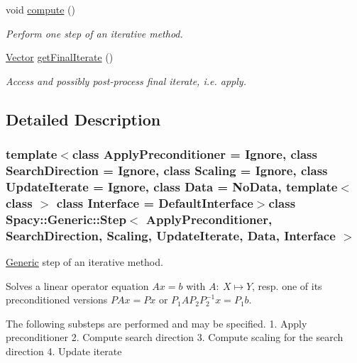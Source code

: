 \begin{DoxyCompactItemize}
\item 
void \hyperlink{classSpacy_1_1Generic_1_1Step_ac400c25a81a5138b4926bbb99692b343}{compute} ()
\begin{DoxyCompactList}\small\item\em \-Perform one step of an iterative method. \end{DoxyCompactList}\item 
\hyperlink{classSpacy_1_1Generic_1_1Vector}{\-Vector} \hyperlink{classSpacy_1_1Generic_1_1Step_a5be9a8afa47319b645b2df73b3b23acc}{get\-Final\-Iterate} ()
\begin{DoxyCompactList}\small\item\em \-Access and possibly post-\/process final iterate, i.\-e. apply. \end{DoxyCompactList}\end{DoxyCompactItemize}


\subsection{\-Detailed \-Description}
\subsubsection*{template$<$class Apply\-Preconditioner = \-Ignore, class Search\-Direction = \-Ignore, class Scaling = \-Ignore, class Update\-Iterate = \-Ignore, class Data = \-No\-Data, template$<$ class $>$ class \-Interface = \-Default\-Interface$>$class Spacy\-::\-Generic\-::\-Step$<$ Apply\-Preconditioner, Search\-Direction, Scaling, Update\-Iterate, Data, Interface $>$}

\hyperlink{namespaceSpacy_1_1Generic}{\-Generic} step of an iterative method. 

\-Solves a linear operator equation $Ax=b$ with $A:\ X\mapsto Y$, resp. one of its preconditioned versions $PAx=Px$ or $P_1AP_2P_2^{-1}x=P_1b$.

\-The following substeps are performed and may be specified. 1. \-Apply preconditioner 2. \-Compute search direction 3. \-Compute scaling for the search direction 4. \-Update iterate 

